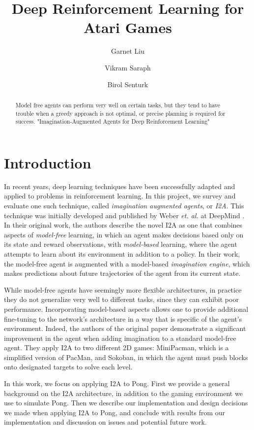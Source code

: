 \documentclass[10pt, twocolumn]{article}
\title{Deep Reinforcement Learning for Atari Games}
\author{Garnet Liu \and Vikram Saraph \and Birol Senturk}
\begin{document}
\maketitle

\begin{abstract}

Model free agents can perform very well on certain tasks, but they tend to  have trouble when a greedy approach is not optimal, or precise planning is required for success.
"Imagination-Augmented Agents for Deep Reinforcement Learning" 

\end{abstract}

\section{Introduction}

In recent years, deep learning techniques have been successfully adapted and applied to problems
in reinforcement learning. In this project, we survey and evaluate one such technique, called \emph{imagination augmented agents}, or \emph{I2A}. This technique was initially developed and published by Weber \emph{et. al.} at DeepMind \cite{I2A}. In their original
work, the authors describe the novel I2A as one that combines aspects of \emph{model-free} learning, in which an agent makes decisions based only on its state and reward observations, with \emph{model-based} learning, where the agent attempts to learn
about its environment in addition to a policy. In their work, the model-free agent is augmented with a model-based \emph{imagination engine}, which makes predictions about future trajectories of the agent from its current state.

While model-free agents have seemingly more flexible architectures, in practice they do not generalize very well to different tasks,
since they can exhibit poor performance. Incorporating model-based aspects allows one to provide additional fine-tuning to the network's architecture in a way that is specific of the 
agent's environment. Indeed, the authors of the original paper demonstrate a significant improvement in the agent when adding 
imagination to a standard model-free agent. They apply I2A to two different 2D games: MiniPacman, which is a simplified version of 
PacMan, and Sokoban, in which the agent must push blocks onto designated targets to solve each level.

In this work, we focus on applying I2A to Pong. First we provide a general background on the I2A architecture, in addition
to the gaming environment we use to simulate Pong. Then we describe our implementation and design decisions we made when applying I2A to Pong, and conclude with results from our implementation and discussion on issues and potential future work.
\end{document}
